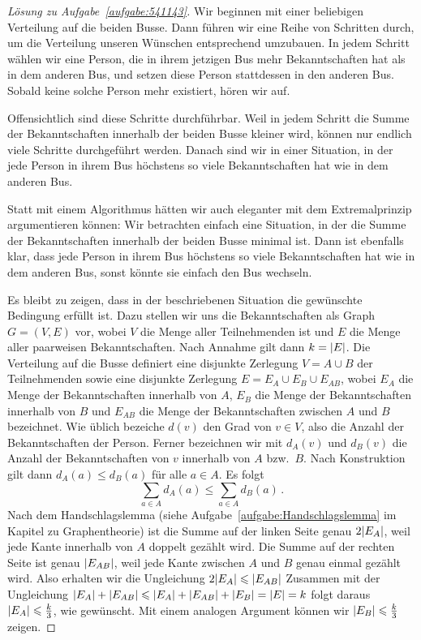 \begin{proof}[Lösung zu Aufgabe~\ref{aufgabe:541143}]
	Wir beginnen mit einer beliebigen Verteilung auf die beiden Busse. Dann führen wir eine Reihe von Schritten durch, um die Verteilung unseren Wünschen entsprechend umzubauen. In jedem Schritt wählen wir eine Person, die in ihrem jetzigen Bus mehr Bekanntschaften hat als in dem anderen Bus, und setzen diese Person stattdessen in den anderen Bus. Sobald keine solche Person mehr existiert, hören wir auf.
	
	Offensichtlich sind diese Schritte durchführbar. Weil in jedem Schritt die Summe der Bekanntschaften innerhalb der beiden Busse kleiner wird, können nur endlich viele Schritte durchgeführt werden. Danach sind wir in einer Situation, in der jede Person in ihrem Bus höchstens so viele Bekanntschaften hat wie in dem anderen Bus.
	
	Statt mit einem Algorithmus hätten wir auch eleganter mit dem Extremalprinzip argumentieren können: Wir betrachten einfach eine Situation, in der die Summe der Bekanntschaften innerhalb der beiden Busse minimal ist. Dann ist ebenfalls klar, dass jede Person in ihrem Bus höchstens so viele Bekanntschaften hat wie in dem anderen Bus, sonst könnte sie einfach den Bus wechseln.
	
	Es bleibt zu zeigen, dass in der beschriebenen Situation die gewünschte Bedingung erfüllt ist. Dazu stellen wir uns die Bekanntschaften als Graph $G=(V,E)$ vor, wobei $V$ die Menge aller Teilnehmenden ist und $E$ die Menge aller paarweisen Bekanntschaften. Nach Annahme gilt dann $k=\lvert E\rvert$. Die Verteilung auf die Busse definiert eine disjunkte Zerlegung $V=A\cup B$ der Teilnehmenden sowie eine disjunkte Zerlegung $E=E_A\cup E_B\cup E_{AB}$, wobei $E_A$ die Menge der Bekanntschaften innerhalb von $A$, $E_B$ die Menge der Bekanntschaften innerhalb von $B$ und $E_{AB}$ die Menge der Bekanntschaften zwischen $A$ und $B$ bezeichnet. Wie üblich bezeiche $d(v)$ den Grad von $v\in V$, also die Anzahl der Bekanntschaften der Person. Ferner bezeichnen wir mit $d_A(v)$ und $d_B(v)$ die Anzahl der Bekanntschaften von $v$ innerhalb von $A$ bzw.\ $B$. Nach Konstruktion gilt dann $d_A(a)\leqslant d_B(a)$ für alle $a\in A$. Es folgt
	\begin{equation*}
		\sum_{a\in A}d_A(a)\leqslant \sum_{a\in A}d_B(a)\,.
	\end{equation*}
	Nach dem Handschlagslemma (siehe Aufgabe~\ref{aufgabe:Handschlagslemma} im Kapitel zu Graphentheorie) ist die Summe auf der linken Seite genau $2\lvert E_A\rvert$, weil jede Kante innerhalb von $A$ doppelt gezählt wird. Die Summe auf der rechten Seite ist genau $\lvert E_{AB}\rvert$, weil jede Kante zwischen $A$ und $B$ genau einmal gezählt wird. Also erhalten wir die Ungleichung $2\lvert E_A\rvert\leqslant \lvert E_{AB}\rvert$ Zusammen mit der Ungleichung $\lvert E_A\rvert+\lvert E_{AB}\rvert\leqslant \lvert E_A\rvert+\lvert E_{AB}\rvert+\lvert E_B\rvert=\lvert E\rvert=k$ folgt daraus $\lvert E_A\rvert\leqslant \frac k3$, wie gewünscht. Mit einem analogen Argument können wir $\lvert E_B\rvert\leqslant \frac k3$ zeigen.
\end{proof}